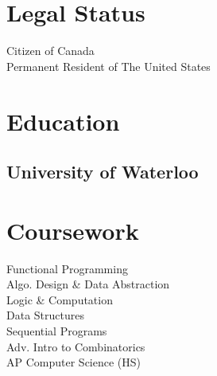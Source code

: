 \documentclass[letterpaper]{deedy-resume} %
\begin{document}
\begin{minipage}[t]{0.33\textwidth} %


  \section{Legal Status} 

  Citizen of Canada \\
  Permanent Resident of The United States

  \sectionspace %


  \section{Education} 

  \subsection{University of Waterloo}


  \sectionspace %



  \section{Coursework}

  Functional Programming \\
  Algo. Design \& Data Abstraction \\
  Logic \& Computation \\
  Data Structures \\
  Sequential Programs \\
  Adv. Intro to Combinatorics \\
  AP Computer Science (HS)


\end{minipage}
\end{document}
